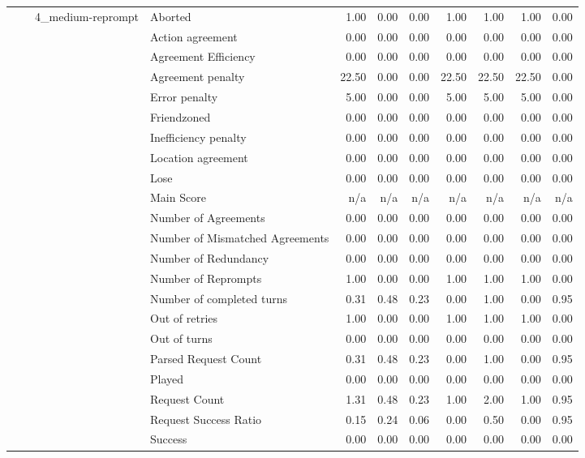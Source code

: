 \begin{tabular}{llllrrrrrrr}
\cline{3-11}
 &  & \multirow[t]{27}{*}{4_medium-reprompt} & Aborted & 1.00 & 0.00 & 0.00 & 1.00 & 1.00 & 1.00 & 0.00 \\
 &  &  & Action agreement & 0.00 & 0.00 & 0.00 & 0.00 & 0.00 & 0.00 & 0.00 \\
 &  &  & Agreement Efficiency & 0.00 & 0.00 & 0.00 & 0.00 & 0.00 & 0.00 & 0.00 \\
 &  &  & Agreement penalty & 22.50 & 0.00 & 0.00 & 22.50 & 22.50 & 22.50 & 0.00 \\
 &  &  & Error penalty & 5.00 & 0.00 & 0.00 & 5.00 & 5.00 & 5.00 & 0.00 \\
 &  &  & Friendzoned & 0.00 & 0.00 & 0.00 & 0.00 & 0.00 & 0.00 & 0.00 \\
 &  &  & Inefficiency penalty & 0.00 & 0.00 & 0.00 & 0.00 & 0.00 & 0.00 & 0.00 \\
 &  &  & Location agreement & 0.00 & 0.00 & 0.00 & 0.00 & 0.00 & 0.00 & 0.00 \\
 &  &  & Lose & 0.00 & 0.00 & 0.00 & 0.00 & 0.00 & 0.00 & 0.00 \\
 &  &  & Main Score & n/a & n/a & n/a & n/a & n/a & n/a & n/a \\
 &  &  & Number of Agreements & 0.00 & 0.00 & 0.00 & 0.00 & 0.00 & 0.00 & 0.00 \\
 &  &  & Number of Mismatched Agreements & 0.00 & 0.00 & 0.00 & 0.00 & 0.00 & 0.00 & 0.00 \\
 &  &  & Number of Redundancy & 0.00 & 0.00 & 0.00 & 0.00 & 0.00 & 0.00 & 0.00 \\
 &  &  & Number of Reprompts & 1.00 & 0.00 & 0.00 & 1.00 & 1.00 & 1.00 & 0.00 \\
 &  &  & Number of completed turns & 0.31 & 0.48 & 0.23 & 0.00 & 1.00 & 0.00 & 0.95 \\
 &  &  & Out of retries & 1.00 & 0.00 & 0.00 & 1.00 & 1.00 & 1.00 & 0.00 \\
 &  &  & Out of turns & 0.00 & 0.00 & 0.00 & 0.00 & 0.00 & 0.00 & 0.00 \\
 &  &  & Parsed Request Count & 0.31 & 0.48 & 0.23 & 0.00 & 1.00 & 0.00 & 0.95 \\
 &  &  & Played & 0.00 & 0.00 & 0.00 & 0.00 & 0.00 & 0.00 & 0.00 \\
 &  &  & Request Count & 1.31 & 0.48 & 0.23 & 1.00 & 2.00 & 1.00 & 0.95 \\
 &  &  & Request Success Ratio & 0.15 & 0.24 & 0.06 & 0.00 & 0.50 & 0.00 & 0.95 \\
 &  &  & Success & 0.00 & 0.00 & 0.00 & 0.00 & 0.00 & 0.00 & 0.00 \\

\end{tabular}
